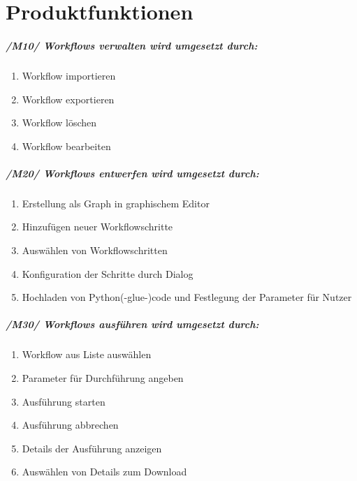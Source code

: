 \chapter{Produktfunktionen}

\paragraph{/M10/ \textit{Workflows verwalten} wird umgesetzt durch:}


\renewcommand{\labelenumi}{/FA\arabic{enumi}0/}
\begin{enumerate}
    \setlength\itemsep{-1em}
    \item Workflow importieren
    \item Workflow exportieren
    \item Workflow löschen
    \item Workflow bearbeiten
    \setcounter{FAs}{\value{enumi}}
\end{enumerate}


\paragraph{/M20/ \textit{Workflows entwerfen} wird umgesetzt durch:}


\renewcommand{\labelenumi}{/FA\arabic{enumi}0/}
\begin{enumerate}
    \setcounter{enumi}{\value{FAs}}
    \setlength\itemsep{-1em}
    \item Erstellung als Graph in graphischem Editor
    \item Hinzufügen neuer Workflowschritte
    \item Auswählen von Workflowschritten
    \item Konfiguration der Schritte durch Dialog
    \item Hochladen von Python(-glue-)code und Festlegung der Parameter für Nutzer %
    \setcounter{FAs}{\value{enumi}}
\end{enumerate}

\paragraph{/M30/ \textit{Workflows ausführen} wird umgesetzt durch:}

\begin{enumerate}
    \setlength\itemsep{-1em}
    \setcounter{enumi}{\value{FAs}}
    \item Workflow aus Liste auswählen
    \item Parameter für Durchführung angeben
    \item Ausführung starten
    \item Ausführung abbrechen
    \item Details der Ausführung anzeigen
    \item Auswählen von Details zum Download
    \setcounter{FAs}{\value{enumi}}
\end{enumerate}
    
